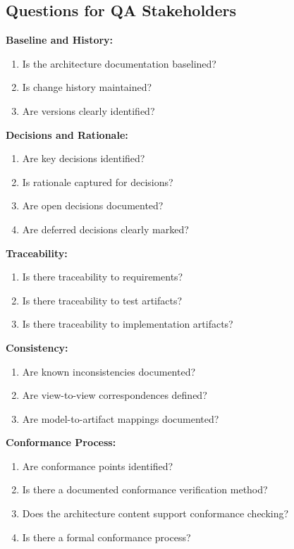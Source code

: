 \documentclass[11pt]{article}
\begin{document}
\subsection{Questions for QA Stakeholders}

\begin{questionbox}

\textbf{Baseline and History:}
\begin{enumerate}
    \item Is the architecture documentation baselined?
    \item Is change history maintained?
    \item Are versions clearly identified?
\end{enumerate}

\textbf{Decisions and Rationale:}
\begin{enumerate}[resume]
    \item Are key decisions identified?
    \item Is rationale captured for decisions?
    \item Are open decisions documented?
    \item Are deferred decisions clearly marked?
\end{enumerate}

\textbf{Traceability:}
\begin{enumerate}[resume]
    \item Is there traceability to requirements?
    \item Is there traceability to test artifacts?
    \item Is there traceability to implementation artifacts?
\end{enumerate}

\textbf{Consistency:}
\begin{enumerate}[resume]
    \item Are known inconsistencies documented?
    \item Are view-to-view correspondences defined?
    \item Are model-to-artifact mappings documented?
\end{enumerate}

\textbf{Conformance Process:}
\begin{enumerate}[resume]
    \item Are conformance points identified?
    \item Is there a documented conformance verification method?
    \item Does the architecture content support conformance checking?
    \item Is there a formal conformance process?
\end{enumerate}


\end{questionbox}
\end{document}
